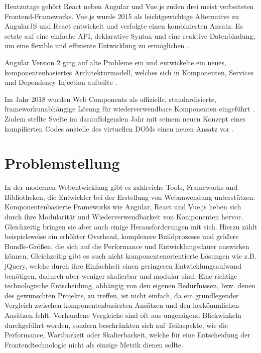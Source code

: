 \documentclass[oneside]{ausarbeitung}
\begin{document}
Heutzutage gehört React neben Angular und Vue.js zuden drei meist verbeiteten Frontend-Frameworks. Vue.js wurde 2015 als leichtgewichtige Alternative zu AngularJS und React entwickelt und verfolgte einen kombinierten Ansatz. 
Es setzte auf eine einfache API, deklarative Syntax und eine reaktive Datenbindung, um eine flexible und effiziente Entwicklung zu ermöglichen \parencite{vue-intro}. 

Angular Version 2 ging auf alte Probleme ein und entwickelte ein neues, komponentenbasiertes Architekturmodell, welches sich in Komponenten, Services und Dependency Injection aufteilte \parencite{angular-docs}. 

Im Jahr 2018 wurden Web Components als offizielle, standardisierte, frameworkunabhängige Lösung für wiederverwendbare Komponenten eingeführt \parencite{mdn-webcomponents}. 
Zudem stellte Svelte im darauffolgenden Jahr mit seinem neuen Konzept eines kompilierten Codes anstelle des virtuellen DOMs einen neuen Ansatz vor \parencite{svelte-intro}.


\section{Problemstellung}
\label{sec:problemstellung}

In der modernen Webentwicklung gibt es zahlreiche Tools, Frameworks und Bibliotheken, die Entwickler bei der Erstellung von Webanwendung unterstützen. Komponentenbasierte Frameworks wie Angular, React und Vue.js heben sich durch ihre Modularität und Wiederverwendbarkeit von Komponenten hervor. Gleichzeitig bringen sie aber auch einige Herausforderungen mit sich. Hierzu zählt beispielsweise ein erhöhter Overhead, komplexere Buildprozesse und größere Bundle-Größen, die sich auf die Performance und Entwicklungsdauer auswirken können.
Gleichzeitig gibt es auch nicht komponentenorientierte Lösungen wie z.B. jQuery, welche durch ihre Einfachheit einen geringeren Entwicklungsaufwand benötigen, dadurch aber weniger skalierbar und modular sind. 
Eine richtige technologische Entscheidung, abhängig von den eigenen Bedürfnissen, bzw. denen des gewünschten Projekts, zu treffen, ist nicht einfach, da ein grundlegender Vergleich zwischen komponentenbasierten Ansätzen und den herkömmlichen Ansätzen fehlt. Vorhandene Vergleiche sind oft aus ungenügend Blickwinkeln durchgeführt worden, sondern beschränkten sich auf Teilaspekte, wie die Performance, Wartbarkeit oder Skalierbarkeit, welche für eine Entscheidung der Frontendtechnologie nicht als einzige Metrik dienen sollte. 
\end{document}
